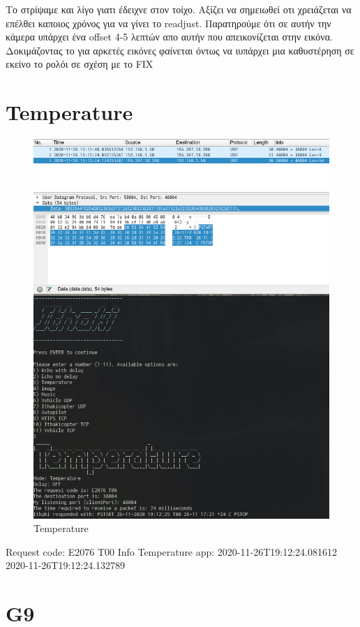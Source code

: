 \documentclass[hidelinks, 12pt, a4paper]{article}
\begin{document}
Το στρίψαμε και λίγο γιατι έδειχνε στον τοίχο. Αξίζει να σημειωθεί οτι χρειάζεται να επέλθει καποιος χρόνος για να γίνει το readjust.
Παρατηρούμε ότι σε αυτήν την κάμερα υπάρχει ένα offset 4-5 λεπτών απο αυτήν που απεικονίζεται στην εικόνα. Δοκιμάζοντας το για αρκετές εικόνες φαίνεται όντως να ιυπάρχει μια καθυστέρηση σε εκείνο το ρολόι σε σχέση με το FIX

\section{Temperature}

\begin{figure}[h!]
\centering
	\includegraphics[height=.38\textheight, width=.8\textwidth]{assets/session1/temp.png}
	\caption{Temperature} 
\end{figure}
Request code: E2076 T00
Info Temperature app:
2020-11-26T19:12:24.081612
2020-11-26T19:12:24.132789


\section{G9}
\end{document}
